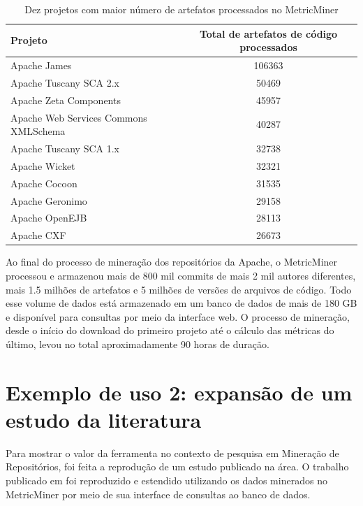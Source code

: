 \documentclass[a4paper, 12pt, twoside]{book}
\begin{document}
        \begin{table}\begin{center}
        \begin{tabular}{| p{6cm} | c |}
            \hline                        
            \textbf{Projeto} & \textbf{Total de artefatos de código processados} \\
            \hline
            Apache James & 106363 \\
            \hline
            Apache Tuscany SCA 2.x & 50469 \\
            \hline
            Apache Zeta Components & 45957\\
            \hline
            Apache Web Services Commons XMLSchema & 40287 \\
            \hline
            Apache Tuscany SCA 1.x & 32738 \\
            \hline
            Apache Wicket & 32321 \\
            \hline
            Apache Cocoon & 31535 \\
            \hline
            Apache Geronimo & 29158 \\
            \hline
            Apache OpenEJB & 28113 \\
            \hline
            Apache CXF & 26673 \\
            \hline
        \end{tabular}
        \caption{Dez projetos com maior número de artefatos processados no MetricMiner \label{tab:artefatos}}
        \end{center}\end{table}

        Ao final do processo de mineração dos repositórios da Apache, o MetricMiner processou e armazenou mais de 800 mil commits de mais 2 mil autores diferentes, mais 1.5 milhões de artefatos e 5 milhões de versões de arquivos de código. Todo esse volume de dados está armazenado em um banco de dados de mais de 180 GB e disponível para consultas por meio da interface web. O processo de mineração, desde o início do download do primeiro projeto até o cálculo das métricas do último, levou no total aproximadamente 90 horas de duração.

    \section{Exemplo de uso 2: expansão de um estudo da literatura} \label{sc:estudo-caso}
        Para mostrar o valor da ferramenta no contexto de pesquisa em Mineração de Repositórios, foi feita a reprodução de um estudo publicado na área. O trabalho publicado em \cite{SoetensQUATIC2010} foi reproduzido e estendido utilizando os dados minerados no MetricMiner por meio de sua interface de consultas ao banco de dados.
\end{document}
